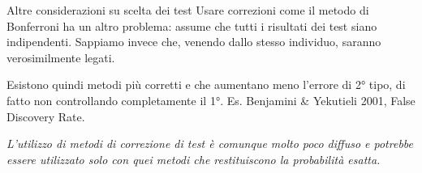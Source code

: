 \documentclass[
  ignorenonframetext,
]{beamer}
\begin{document}
\begin{frame}{Altre considerazioni su scelta dei test}
\label{altre-considerazioni-su-scelta-dei-test-1}
Usare correzioni come il metodo di Bonferroni ha un altro problema:
assume che tutti i risultati dei test siano indipendenti. Sappiamo
invece che, venendo dallo stesso individuo, saranno verosimilmente
legati.

Esistono quindi metodi più corretti e che aumentano meno l'errore di 2°
tipo, di fatto non controllando completamente il 1°. Es. Benjamini \&
Yekutieli 2001, False Discovery Rate.

\emph{L'utilizzo di metodi di correzione di test è comunque molto poco
diffuso e potrebbe essere utilizzato solo con quei metodi che
restituiscono la probabilità esatta.}
\end{frame}
\end{document}
